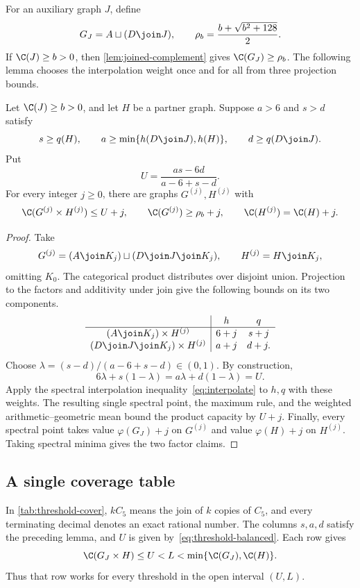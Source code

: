 For an auxiliary graph $J$, define
\[
 G_J=A\sqcup(D\join J),\qquad
 \rho_b=\frac{b+\sqrt{b^2+128}}2.
\]
If $\C(J)\ge b>0$, then \cref{lem:joined-complement} gives
$\C(G_J)\ge\rho_b$. The following lemma chooses the interpolation
weight once and for all from three projection bounds.

\begin{lemma}\label{lem:threshold-padding}
Let $\C(J)\ge b>0$, and let $H$ be a partner graph. Suppose
$a>6$ and $s>d$ satisfy
\[
 s\ge q(H),\qquad
 a\ge\min\{h(D\join J),h(H)\},\qquad
 d\ge q(D\join J).
\]
Put
\begin{equation}\label{eq:threshold-balanced}
 U=\frac{as-6d}{a-6+s-d}.
\end{equation}
For every integer $j\ge0$, there are graphs $G^{(j)},H^{(j)}$ with
\[
 \C(G^{(j)}\times H^{(j)})\le U+j,\qquad
 \C(G^{(j)})\ge\rho_b+j,\qquad
 \C(H^{(j)})=\C(H)+j.
\]
\end{lemma}
\begin{proof}
Take
\[
 G^{(j)}=(A\join K_j)\sqcup(D\join J\join K_j),\qquad
 H^{(j)}=H\join K_j,
\]
omitting $K_0$. The categorical product distributes over disjoint
union. Projection to the factors and additivity under join give the
following bounds on its two components.
\[
\begin{array}{c|cc}
 &h&q\\ \hline
 (A\join K_j)\times H^{(j)}&6+j&s+j\\
 (D\join J\join K_j)\times H^{(j)}&a+j&d+j.
\end{array}
\]
Choose $\lambda=(s-d)/(a-6+s-d)\in(0,1)$. By construction,
\[
 6\lambda+s(1-\lambda)=a\lambda+d(1-\lambda)=U.
\]
Apply the spectral interpolation inequality~\eqref{eq:interpolate}
to $h,q$ with these weights. The resulting single spectral point,
the maximum rule, and the weighted
arithmetic--geometric mean bound the product capacity by $U+j$.
Finally, every spectral point takes value $\varphi(G_J)+j$ on
$G^{(j)}$ and value $\varphi(H)+j$ on $H^{(j)}$.
Taking spectral minima gives the two factor claims.
\end{proof}

\subsection{A single coverage table}

In \cref{tab:threshold-cover}, $kC_5$ means the join of $k$ copies of $C_5$,
and every terminating decimal denotes an exact rational number.
The columns $s,a,d$ satisfy the preceding lemma, and $U$ is
given by~\eqref{eq:threshold-balanced}. Each row gives
\begin{equation}\label{eq:threshold-row}
 \C(G_J\times H)\le U<L<\min\{\C(G_J),\C(H)\}.
\end{equation}
Thus that row works for every threshold in the open interval $(U,L)$.


